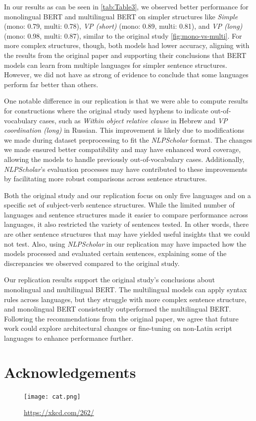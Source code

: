 \documentclass[11pt]{article}
\begin{document}
In our results as can be seen in \autoref{tab:Table3}, we observed better performance for monolingual BERT and multilingual BERT on simpler structures like \textit{Simple} (mono: 0.79, multi: 0.78), \textit{VP (short)} (mono: 0.89, multi: 0.81), and \textit{VP (long)} (mono: 0.98, multi: 0.87), similar to the original study \autoref{fig:mono-vs-multi}. For more complex structures, though, both models had lower accuracy, aligning with the results from the original paper and supporting their conclusions that BERT models can learn from multiple languages for simpler sentence structures. However, we did not have as strong of evidence to conclude that some languages perform far better than others.

One notable difference in our replication is that we were able to compute results for constructions where the original study used hyphens to indicate out-of-vocabulary cases, such as \textit{Within object relative clause} in Hebrew and \textit{VP coordination (long)} in Russian. This improvement is likely due to modifications we made during dataset preprocessing to fit the \textit{NLPScholar} format. The changes we made ensured better compatibility and may have enhanced word coverage, allowing the models to handle previously out-of-vocabulary cases. Additionally, \textit{NLPScholar}’s evaluation processes may have contributed to these improvements by facilitating more robust comparisons across sentence structures.

Both the original study and our replication focus on only five languages and on a specific set of subject-verb sentence structures. While the limited number of languages and sentence structures made it easier to compare performance across languages, it also restricted the variety of sentences tested. In other words, there are other sentence structures that may have yielded useful insights that we could not test. Also, using \textit{NLPScholar} in our replication may have impacted how the models processed and evaluated certain sentences, explaining some of the discrepancies we observed compared to the original study.

Our replication results support the original study's conclusions about monolingual and multilingual BERT. The multilingual models can apply syntax rules across languages, but they struggle with more complex sentence structure, and monolingual BERT consistently outperformed the multilingual BERT. Following the recommendations from the original paper, we agree that future work could explore architectural changes or fine-tuning on non-Latin script languages to enhance performance further.

\section*{Acknowledgements}

\begin{figure}[htbp]
    \centering
    \texttt{[image: cat.png]}
    \caption{\url{https://xkcd.com/262/}}
    \label{fig:cat}
\end{figure}




\end{document}
